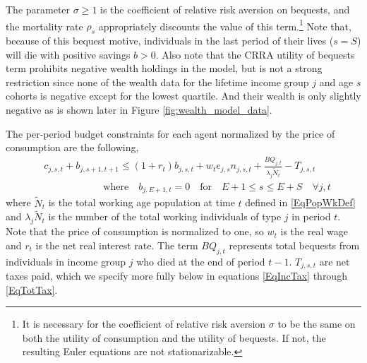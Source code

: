 \documentclass[letterpaper,12pt]{article}
\theoremstyle{definition}
\begin{document}
\begin{spacing}{1.5}
    The parameter $\sigma\geq 1$ is the coefficient of relative risk aversion on bequests, and the mortality rate $\rho_s$ appropriately discounts the value of this term.\footnote{It is necessary for the coefficient of relative risk aversion $\sigma$ to be the same on both the utility of consumption and the utility of bequests. If not, the resulting Euler equations are not stationarizable.} Note that, because of this bequest motive, individuals in the last period of their lives ($s=S$) will die with positive savings $b>0$. Also note that the CRRA utility of bequests term prohibits negative wealth holdings in the model, but is not a strong restriction since none of the wealth data for the lifetime income group $j$ and age $s$ cohorts is negative except for the lowest quartile. And their wealth is only slightly negative as is shown later in Figure \ref{fig:wealth_model_data}.

    The per-period budget constraints for each agent normalized by the price of consumption are the following,
    \begin{equation}\label{EqBC}
      \begin{split}
        &c_{j,s,t} + b_{j,s+1,t+1} \leq \left(1 + r_t\right) b_{j,s,t} + w_t e_{j,s}n_{j,s,t} + \frac{BQ_{j,t}}{\lambda_j\tilde{N}_t} - T_{j,s,t} \\
        &\qquad\qquad\qquad\text{where}\quad b_{j,E+1,t} = 0\quad\text{for} \quad E+1\leq s \leq E+S \quad \forall j,t
      \end{split}
    \end{equation}
    where $\tilde{N}_t$ is the total working age population at time $t$ defined in \eqref{EqPopWkDef} and $\lambda_j\tilde{N}_t$ is the number of the total working individuals of type $j$ in period $t$. Note that the price of consumption is normalized to one, so $w_t$ is the real wage and $r_t$ is the net real interest rate. The term $BQ_{j,t}$ represents total bequests from individuals in income group $j$ who died at the end of period $t-1$. $T_{j,s,t}$ are net taxes paid, which we specify more fully below in equations \eqref{EqIncTax} through \eqref{EqTotTax}.


\end{spacing}
\end{document}

